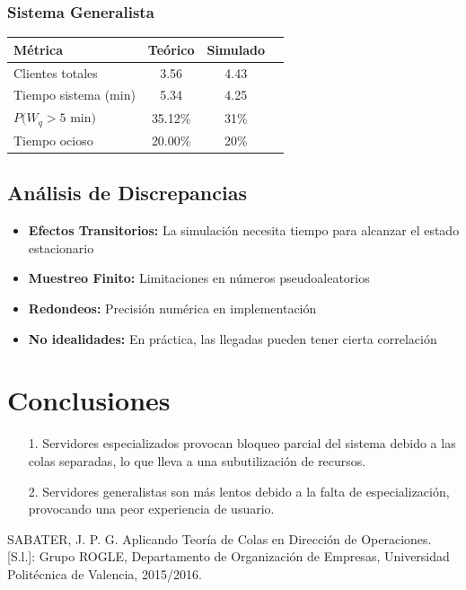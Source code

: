 \documentclass[letterpaper, 12pt]{report}
\begin{document}
\subsection{Sistema Generalista}
\begin{table}[h]
\centering
\begin{tabular}{lccc}
\toprule
Métrica & Teórico & Simulado  \\
\midrule
Clientes totales & 3.56 & 4.43  \\
Tiempo sistema (min) & 5.34 & 4.25  \\
$P(W_q >5$ min$)$ & 35.12\% & 31\%  \\
Tiempo ocioso & 20.00\% & 20\%  \\
\bottomrule
\end{tabular}
\end{table}

\section{Análisis de Discrepancias}
\begin{itemize}
\item \textbf{Efectos Transitorios:} La simulación necesita tiempo para alcanzar el estado estacionario
\item \textbf{Muestreo Finito:} Limitaciones en números pseudoaleatorios
\item \textbf{Redondeos:} Precisión numérica en implementación
\item \textbf{No idealidades:} En práctica, las llegadas pueden tener cierta correlación
\end{itemize}

\chapter{Conclusiones}


\begin{itemize}
    \item[1.] Servidores especializados provocan bloqueo parcial del sistema debido a las
    colas separadas, lo que lleva a una subutilización de recursos.
    \item[2.] Servidores generalistas son más lentos debido a la falta de especialización,
    provocando una peor experiencia de usuario.
\end{itemize}


\begin{thebibliography}{9}
     SABATER, J. P. G. Aplicando Teoría de Colas en Dirección de Operaciones. [S.l.]:
    Grupo ROGLE, Departamento de Organización de Empresas, Universidad Politécnica
    de Valencia, 2015/2016.
 
\end{thebibliography}
\end{document}
